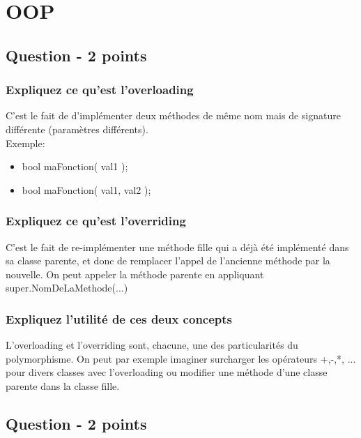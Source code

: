 \section{OOP}



\subsection{Question - 2 points}



\subsubsection{Expliquez ce qu'est l'overloading}
\color[rgb]{0,0.48,0.58}
C'est le fait de d'implémenter deux méthodes de même nom mais de signature différente (paramètres différents).
\\Exemple:
\begin{itemize}
    \item bool maFonction( val1 );
	\item bool maFonction( val1, val2 );
\end{itemize}
\color[rgb]{0,0,0}



\subsubsection{Expliquez ce qu'est l'overriding}
\textcolor[rgb]{0,0.48,0.58}{C'est le fait de re-implémenter une méthode fille qui a déjà été implémenté dans sa classe parente, et donc de remplacer l'appel de l'ancienne méthode par la nouvelle. On peut appeler la méthode parente en appliquant super.NomDeLaMethode(...) }



\subsubsection{Expliquez l'utilité de ces deux concepts}
\textcolor[rgb]{0,0.48,0.58}{L'overloading et l'overriding sont, chacune, une des particularités du polymorphisme. On peut par exemple imaginer surcharger les opérateurs +,-,*, ... pour divers classes avec l'overloading ou modifier une méthode d'une classe parente dans la classe fille.}



\subsection{Question - 2 points}



